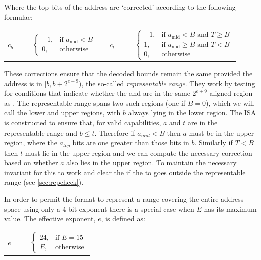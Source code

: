 Where the top bits of the address are `corrected' according to the following formulae:

\begin{center}
\begin{tabular}{r c l p{1em} r c l}
$c_b$ & = & $\begin{cases}
-1, & \text{if } a_\text{mid} < B \\
0,  & \text{otherwise}
\end{cases}$ 
&&
$c_t$ & = & $\begin{cases}
  -1, & \text{if } a_\text{mid} < B \text{ and } T \ge B \\
  1,  & \text{if } a_\text{mid} \ge B \text{ and } T < B \\
  0,  & \text{otherwise}
\end{cases}$
\end{tabular}
\end{center}

These corrections ensure that the decoded bounds remain the same provided the address is in $[b, b + 2^{e+9})$, the so-called \emph{representable range}.
They work by testing for conditions that indicate whether the \ctop{} and \caddress{} are in the same $2^{e+9}$ aligned region as \cbase{}.
The representable range spans two such regions (one if $B = 0$), which we will call the lower and upper regions, with $b$ always lying in the lower region.
The ISA is constructed to ensure that, for valid capabilities, $a$ and $t$ are in the representable range and $b \le t$.
Therefore if $a_{mid} \lt B$ then $a$ must be in the upper region, where the $a_{top}$ bits are one greater than those bits in $b$.
Similarly if $T \lt B$ then $t$ must lie in the upper region and we can compute the necessary correction based on whether $a$ also lies in the upper region.
To maintain the necessary invariant for this to work  and  clear the \ctag{} if the \caddress{} to goes outside the representable range (see \cref{sec:repcheck}).

In order to permit the format to represent a range covering the entire address space using only a 4-bit exponent there is a special case when $E$ has its maximum value.
The effective exponent, $e$, is defined as:

\begin{center}
\begin{tabular}{r c l}
$e$ &=& $ \begin{cases}
              24,& \text{if } E = 15 \\
              E,& \text{otherwise}
\end{cases} $ \\
\end{tabular}
\end{center}

